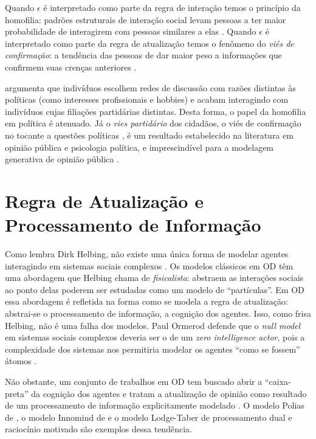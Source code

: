 Quando \(\epsilon\) é interpretado como parte da regra de interação temos o princípio
da homofilia: padrões estruturais de interação social levam pessoas a ter maior
probabilidade de interagirem com pessoas similares a elas
\cite{mcpherson2001birds}. Quando \(\epsilon\) é interpretado como parte da regra de
atualização temos o fenômeno do \textit{viés de confirmação}: a tendência das
pessoas de dar maior peso a informações que confirmem suas crenças anteriores
\cite{nickerson1998confirmation}.

 argumenta que indivíduos escolhem redes de
discussão com razões distintas às políticas (como interesses profissionais e
hobbies) e acabam interagindo com indivíduos cujas filiações partidárias
distintas. Desta forma, o papel da homofilia em política é atenuado. Já o
\textit{vies partidário} dos cidadãos, o viés de confirmação no tocante a
questões políticas , é um resultado estabelecido na literatura em opinião
pública e psicologia política, e imprescindível para a modelagem generativa de
opinião pública \cite{bartels2002beyond, flynn2017nature,
  lodge2013rationalizing}.


\section{Regra de Atualização e Processamento de Informação}


Como lembra Dirk Helbing, não existe uma única forma de modelar agentes
interagindo em sistemas sociais complexos \cite{helbing2010pluralistic}. Os
modelos clássicos em OD têm uma abordagem que Helbing chama de
\textit{fisicalista}: abstraem as interações sociais ao ponto delas poderem ser
estudadas como um modelo de ``partículas''. Em OD essa abordagem é refletida na
forma como se modela a regra de atualização: abstrai-se o processamento de
informação, a cognição dos agentes. Isso, como frisa Helbing, não é uma falha
dos modelos. Paul Ormerod defende que o \textit{null model} em sistemas sociais
complexos deveria ser o de um \textit{zero intelligence actor}, pois a
complexidade dos sistemas nos permitiria modelar os agentes ``como se fossem''
átomos \cite{ormerod2008can, bentley2012agents}.

Não obstante, um conjunto de trabalhos em OD tem buscado abrir a ``caixa-preta''
da cognição dos agentes e tratam a atualização de opinião como resultado de um
processamento de informação explicitamente modelado \cite{flache2017,
  jager2017}. O modelo Polias de , o modelo
Innomind de  e o modelo Lodge-Taber
\cite{kim2010computational,kim2011model} de processamento dual e raciocínio
motivado são exemplos dessa tendência.

